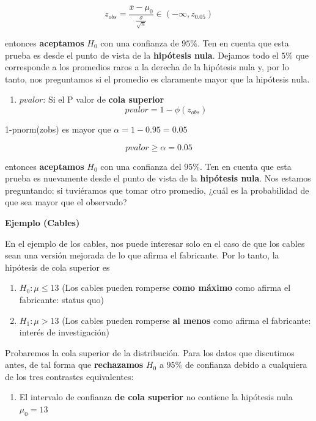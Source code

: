 \documentclass[
]{book}
\providecommand{\tightlist}{%
  \setlength{\itemsep}{0pt}\setlength{\parskip}{0pt}}
\begin{document}
\[z_{obs}=\frac{\bar{x}-\mu_0}{\frac{\sigma}{\sqrt{n}}} \in (-\infty, z_{0.05})\]

entonces \textbf{aceptamos} \(H_0\) con una confianza de \(95\%\). Ten en cuenta que esta prueba es desde el punto de vista de la \textbf{hipótesis nula}. Dejamos todo el \(5\%\) que corresponde a los promedios raros a la derecha de la hipótesis nula y, por lo tanto, nos preguntamos si el promedio es claramente mayor que la hipótesis nula.

\begin{enumerate}
\def\labelenumi{\arabic{enumi}.}
\setcounter{enumi}{2}
\tightlist
\item
  \(pvalor\): Si el P valor de \textbf{cola superior} \[pvalor= 1-\phi(z_{obs})\]
\end{enumerate}

1-pnorm(zobs) es mayor que \(\alpha=1-0.95=0.05\)

\[pvalor \geq \alpha =0.05\]

entonces \textbf{aceptamos} \(H_0\) con una confianza del \(95\%\). Ten en cuenta que esta prueba es nuevamente desde el punto de vista de la \textbf{hipótesis nula}. Nos estamos preguntando: si tuviéramos que tomar otro promedio, ¿cuál es la probabilidad de que sea mayor que el observado?

\textbf{Ejemplo (Cables)}

En el ejemplo de los cables, nos puede interesar solo en el caso de que los cables sean una versión mejorada de lo que afirma el fabricante. Por lo tanto, la hipótesis de cola superior es

\begin{enumerate}
\def\labelenumi{\alph{enumi}.}
\tightlist
\item
  \(H_0:\mu \leq 13\) (Los cables pueden romperse \textbf{como máximo} como afirma el fabricante: status quo)
\item
  \(H_1:\mu > 13\) (Los cables pueden romperse \textbf{al menos} como afirma el fabricante: interés de investigación)
\end{enumerate}

Probaremos la cola superior de la distribución.
Para los datos que discutimos antes, de tal forma que \textbf{rechazamos} \(H_0\) a \(95\%\) de confianza debido a cualquiera de los tres contrastes equivalentes:

\begin{enumerate}
\def\labelenumi{\arabic{enumi}.}
\tightlist
\item
  El intervalo de confianza \textbf{de cola superior} no contiene la hipótesis nula \(\mu_0=13\)
\end{enumerate}
\end{document}
